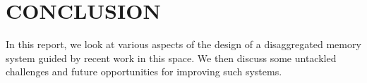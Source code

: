 
\section{CONCLUSION}
\label{sec:conclusion}
In this report, we look at various aspects of 
the design of a disaggregated memory system
guided by recent work in this space. We then 
discuss some untackled challenges and future 
opportunities for improving such systems. 
